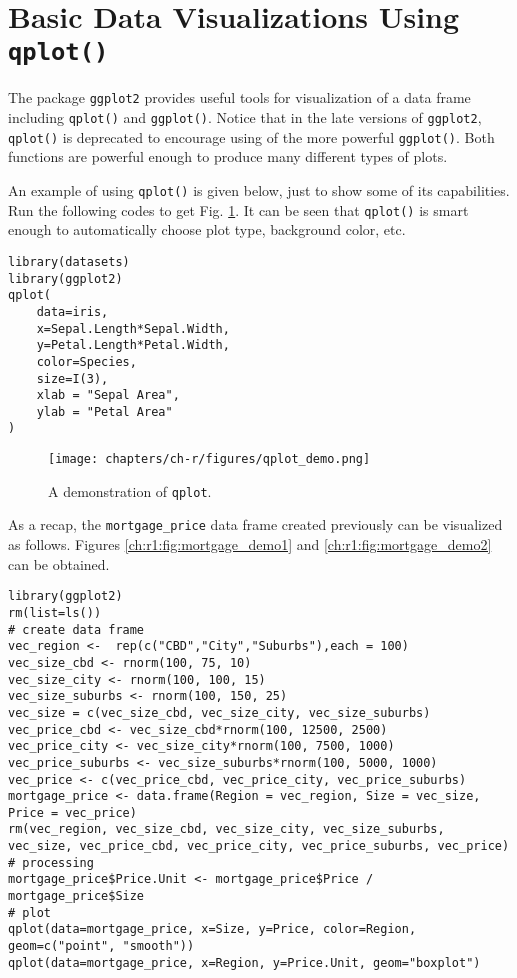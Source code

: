 \section{Basic Data Visualizations Using \texttt{qplot()}} \label{ch:r1:sec:qplot}

The package \verb|ggplot2| provides useful tools for visualization of a data frame including \verb|qplot()| and \verb|ggplot()|. Notice that in the late versions of \verb|ggplot2|, \verb|qplot()| is deprecated to encourage using of the more powerful \verb|ggplot()|. Both functions are powerful enough to produce many different types of plots.

An example of using \verb|qplot()| is given below, just to show some of its capabilities. Run the following codes to get Fig. \ref{ch:r1:fig:qplot_demo}. It can be seen that \verb|qplot()| is smart enough to automatically choose plot type, background color, etc.
\begin{lstlisting}
library(datasets)
library(ggplot2)
qplot(
    data=iris,
    x=Sepal.Length*Sepal.Width,
    y=Petal.Length*Petal.Width,
    color=Species,
    size=I(3),
    xlab = "Sepal Area",
    ylab = "Petal Area"
)
\end{lstlisting}

\begin{figure}
	\centering
	\texttt{[image: chapters/ch-r/figures/qplot\_demo.png]}
	\caption{A demonstration of \texttt{qplot}.} \label{ch:r1:fig:qplot_demo}
\end{figure}

As a recap, the \verb|mortgage_price| data frame created previously can be visualized as follows. Figures \ref{ch:r1:fig:mortgage_demo1} and \ref{ch:r1:fig:mortgage_demo2} can be obtained.
\begin{lstlisting}
library(ggplot2)
rm(list=ls())
# create data frame
vec_region <-  rep(c("CBD","City","Suburbs"),each = 100)
vec_size_cbd <- rnorm(100, 75, 10)
vec_size_city <- rnorm(100, 100, 15)
vec_size_suburbs <- rnorm(100, 150, 25)
vec_size = c(vec_size_cbd, vec_size_city, vec_size_suburbs)
vec_price_cbd <- vec_size_cbd*rnorm(100, 12500, 2500)
vec_price_city <- vec_size_city*rnorm(100, 7500, 1000)
vec_price_suburbs <- vec_size_suburbs*rnorm(100, 5000, 1000)
vec_price <- c(vec_price_cbd, vec_price_city, vec_price_suburbs)
mortgage_price <- data.frame(Region = vec_region, Size = vec_size, Price = vec_price)
rm(vec_region, vec_size_cbd, vec_size_city, vec_size_suburbs, vec_size, vec_price_cbd, vec_price_city, vec_price_suburbs, vec_price)
# processing
mortgage_price$Price.Unit <- mortgage_price$Price / mortgage_price$Size
# plot
qplot(data=mortgage_price, x=Size, y=Price, color=Region, geom=c("point", "smooth"))
qplot(data=mortgage_price, x=Region, y=Price.Unit, geom="boxplot")
\end{lstlisting}


